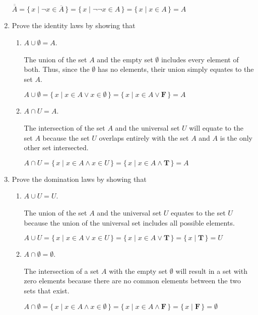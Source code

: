 \documentclass[11pt]{article}
\begin{document}
\begin{enumerate}[label=\textbf{\arabic*.}]
	$\overline{\overline{A}} = \{\,x \mid \neg x \in \overline{A}\,\} = \{\,x \mid \neg\neg x \in A\,\} = \{\,x \mid x \in A\,\} = A$
	
	\item Prove the identity laws by showing that
	
	\begin{enumerate}[label=\textbf{\alph*)}]
		\item $A \cup \emptyset = A$.
		
		The union of the set $A$ and the empty set $\emptyset$ includes every element of both. Thus, since the $\emptyset$ has no elements, their union simply equates to the set $A$.
		
		$A \cup \emptyset = \{\,x \mid x \in A \lor x \in \emptyset\,\} = \{\,x \mid x \in A \lor \textbf{F}\,\} = A$
		
		\item $A \cap U = A$.
		
		The intersection of the set $A$ and the universal set $U$ will equate to the set $A$ because the set $U$ overlaps entirely with the set $A$ and $A$ is the only other set intersected.
		
		$A \cap U = \{\,x \mid x \in A \land x \in U\,\} = \{\,x \mid x \in A \land \textbf{T}\,\} = A$
	\end{enumerate}

	\item Prove the domination laws by showing that
	
	\begin{enumerate}[label=\textbf{\alph*)}]
		\item $A \cup U = U$.
		
		The union of the set $A$ and the universal set $U$ equates to the set $U$ because the union of the universal set includes all possible elements.
		
		$A \cup U = \{\,x \mid x \in A \lor x \in U\,\} = \{\,x \mid x \in A \lor \textbf{T}\,\} = \{\,x \mid \textbf{T}\,\} = U$
		
		\item $A \cap \emptyset = \emptyset$.
		
		The intersection of a set $A$ with the empty set $\emptyset$ will result in a set with zero elements because there are no common elements between the two sets that exist.
		
		$A \cap \emptyset = \{\,x \mid x \in A \land x \in \emptyset\,\} = \{\,x \mid x \in A \land \textbf{F}\,\} = \{\,x \mid \textbf{F}\,\} = \emptyset$
	\end{enumerate}


\end{enumerate}
\end{document}
